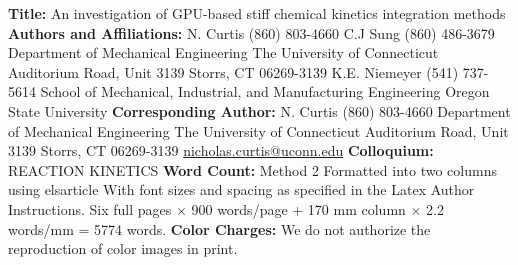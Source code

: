 \documentclass[final,twocolumn]{elsarticle}
\begin{document}
\iftitlepage
\begin{titlepage}
\parbox{\linewidth}{
\begin{flushleft}
\textbf{Title:}\linebreak
An investigation of GPU-based stiff chemical kinetics integration methods
\linebreak
\linebreak
\textbf{Authors and Affiliations:} \linebreak\linebreak
  N.  Curtis	(860) 803-4660 \linebreak
  C.J Sung	(860) 486-3679 \linebreak
  Department of Mechanical Engineering \linebreak
  The University of Connecticut  Auditorium Road, Unit 3139 \linebreak
  Storrs, CT 06269-3139 \linebreak
  \linebreak
  K.E. Niemeyer	(541) 737-5614 \linebreak
  School of Mechanical, Industrial, and Manufacturing Engineering\linebreak
  Oregon State University\linebreak
\linebreak
\textbf{Corresponding Author:}\linebreak
  N. Curtis\linebreak
  (860) 803-4660 \linebreak
  Department of Mechanical Engineering\linebreak
  The University of Connecticut  Auditorium Road, Unit 3139 \linebreak
  Storrs, CT 06269-3139 \linebreak
  \href{mailto:nicholas.curtis@uconn.edu}{nicholas.curtis@uconn.edu}\linebreak
\linebreak
\textbf{Colloquium:}\linebreak
REACTION KINETICS\linebreak
\linebreak
\textbf{Word Count:}\linebreak
Method 2\linebreak
Formatted into two columns using elsarticle\linebreak
With font sizes and spacing as specified in the Latex Author Instructions.\linebreak
Six full pages $\times$ 900 words/page + 170 mm column $\times$ 2.2 words/mm = 5774 words.\linebreak
\textbf{Color Charges:}\linebreak
We do not authorize the reproduction of color images in print.
\end{flushleft}
}
\end{titlepage}
\end{document}
